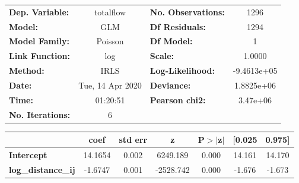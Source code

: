 \begin{center}
\begin{tabular}{lclc}
\toprule
\textbf{Dep. Variable:}    &    totalflow     & \textbf{  No. Observations:  } &      1296    \\
\textbf{Model:}            &       GLM        & \textbf{  Df Residuals:      } &      1294    \\
\textbf{Model Family:}     &     Poisson      & \textbf{  Df Model:          } &         1    \\
\textbf{Link Function:}    &       log        & \textbf{  Scale:             } &     1.0000   \\
\textbf{Method:}           &       IRLS       & \textbf{  Log-Likelihood:    } & -9.4613e+05  \\
\textbf{Date:}             & Tue, 14 Apr 2020 & \textbf{  Deviance:          } &  1.8825e+06  \\
\textbf{Time:}             &     01:20:51     & \textbf{  Pearson chi2:      } &   3.47e+06   \\
\textbf{No. Iterations:}   &        6         & \textbf{                     } &              \\
\bottomrule
\end{tabular}
\begin{tabular}{lcccccc}
                           & \textbf{coef} & \textbf{std err} & \textbf{z} & \textbf{P$> |$z$|$} & \textbf{[0.025} & \textbf{0.975]}  \\
\midrule
\textbf{Intercept}         &      14.1654  &        0.002     &  6249.189  &         0.000        &       14.161    &       14.170     \\
\textbf{log\_distance\_ij} &      -1.6747  &        0.001     & -2528.742  &         0.000        &       -1.676    &       -1.673     \\
\bottomrule
\end{tabular}
\end{center}
